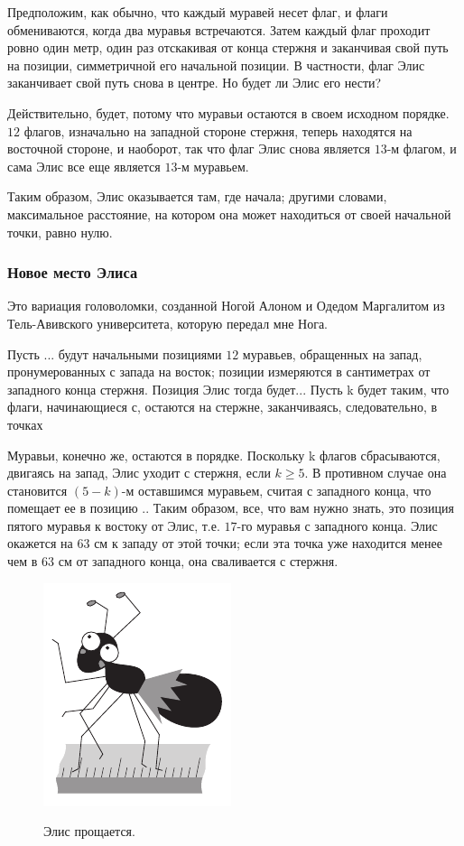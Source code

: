 Предположим, как обычно, что каждый муравей несет флаг, и флаги обмениваются, когда два муравья встречаются. Затем каждый флаг проходит ровно один метр, один раз отскакивая от конца стержня и заканчивая свой путь на позиции, симметричной его начальной позиции. В частности, флаг Элис заканчивает свой путь снова в центре. Но будет ли Элис его нести?

Действительно, будет, потому что муравьи остаются в своем исходном порядке.
$12$ флагов, изначально на западной стороне стержня, теперь находятся на восточной стороне, и наоборот, так что флаг Элис снова является $13$-м флагом, и сама Элис все еще является $13$-м муравьем.

Таким образом, Элис оказывается там, где начала; другими словами, максимальное расстояние, на котором она может находиться от своей начальной точки, равно нулю.

\subsubsection*{Новое место Элиса}

Это вариация головоломки, созданной Ногой Алоном и Одедом Маргалитом из Тель-Авивского университета, которую передал мне Нога.

Пусть ... будут начальными позициями $12$ муравьев, обращенных на запад, пронумерованных с запада на восток; позиции измеряются в сантиметрах от западного конца стержня.
Позиция Элис тогда будет...
Пусть k будет таким, что флаги, начинающиеся с, остаются на стержне, заканчиваясь, следовательно, в точках

Муравьи, конечно же, остаются в порядке.
Поскольку k флагов сбрасываются, двигаясь на запад, Элис уходит с стержня, если $k\ge 5$.
В противном случае она становится $(5-k)$-м оставшимся муравьем, считая с западного конца, что помещает ее в позицию ..
Таким образом, все, что вам нужно знать, это позиция пятого муравья к востоку от Элис, т.е. $17$-го муравья с западного конца.
Элис окажется на $63$ см к западу от этой точки; если эта точка уже находится менее чем в $63$ см от западного конца, она сваливается с стержня.

\begin{figure}[h!]
\centering
\includegraphics[scale=1]{pics/alice2}
\label{pic:alice2}
\caption{Элис прощается.}
\end{figure}
